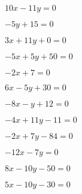 \begin{esercizio}\label{ese:}
 \begin{multicols}{3}
 \begin{enumeratea}
  \item  $10 x - 11 y = 0$
  \item  $- 5 y + 15 = 0$
  \item  $3 x + 11 y + 0 = 0$
 \end{enumeratea}
 \end{multicols}
\end{esercizio}

\begin{esercizio}\label{ese:}
 \begin{multicols}{3}
 \begin{enumeratea}
  \item  $-5 x + 5 y + 50 = 0$
  \item  $-2 x + 7 = 0$
  \item  $6 x - 5 y + 30 = 0$
 \end{enumeratea}
 \end{multicols}
\end{esercizio}

\begin{esercizio}\label{ese:}
 \begin{multicols}{3}
 \begin{enumeratea}
  \item  $-8 x - y + 12 = 0$
  \item  $-4 x + 11 y - 11 = 0$
  \item  $-2 x + 7 y - 84 = 0$
 \end{enumeratea}
 \end{multicols}
\end{esercizio}

\begin{esercizio}\label{ese:}
 \begin{multicols}{3}
 \begin{enumeratea}
  \item  $-12 x - 7 y = 0$
  \item  $8 x - 10 y - 50 = 0$
  \item  $5 x - 10 y - 30 = 0$
 \end{enumeratea}
 \end{multicols}
\end{esercizio}

\subsubsection*{}

